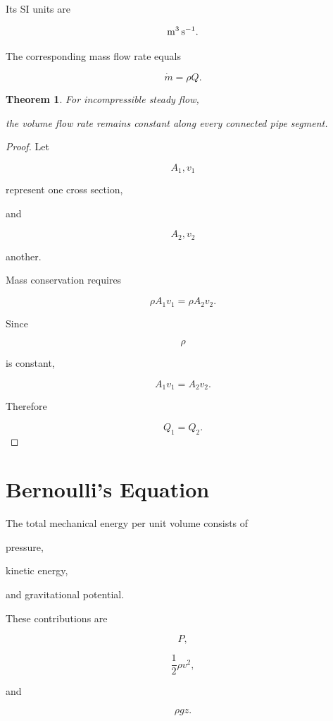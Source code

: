 \documentclass[11pt,fleqn]{book}
\numberwithin{equation}{chapter}
\theoremstyle{plain}
\newtheorem{theorem}{Theorem}[chapter]
\theoremstyle{definition}
\theoremstyle{remark}
\begin{document}
Its SI units are

\[
{\rm m^3\,s^{-1}}.
\]

The corresponding mass flow rate equals

\[
\dot m
=
\rho Q.
\]


\begin{theorem}

For incompressible steady flow,

the volume flow rate remains constant along every connected pipe segment.

\end{theorem}

\begin{proof}

Let

\[
A_1,
v_1
\]

represent one cross section,

and

\[
A_2,
v_2
\]

another.

Mass conservation requires

\[
\rho A_1v_1
=
\rho A_2v_2.
\]

Since

\[
\rho
\]

is constant,

\[
A_1v_1
=
A_2v_2.
\]

Therefore

\[
Q_1
=
Q_2.
\]

\end{proof}


\section{Bernoulli's Equation}

The total mechanical energy per unit volume consists of

pressure,

kinetic energy,

and gravitational potential.

These contributions are

\[
P,
\]

\[
\frac12\rho v^2,
\]

and

\[
\rho gz.
\]
\end{document}
